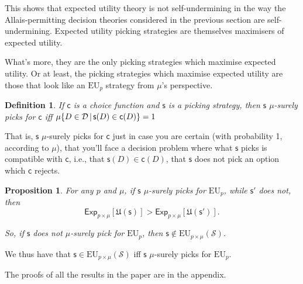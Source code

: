 \documentclass[a4paper]{article}
\newtheorem{definition}{Definition}
\newtheorem{proposition}[theorem]{Proposition}
\newcommand\D{\mathcal{D}}
\newcommand\s{\mathsf{s}}
\renewcommand\c{\mathsf{c}} %
\newcommand\Exp{\mathsf{Exp}}
\newcommand\EU{\mathrm{EU}}
\newcommand\U{\mathfrak{U}} %
\renewcommand{\color}[1]{}
\newcommand{\Strategies}{\mathcal{S}}
\newcommand\SetDelimiter[1][]{
	\nonscript\,#1\vert \allowbreak \nonscript\,\mathopen{}}
\providecommand\given{\SetDelimiter}
\newenvironment{CCM rewritten}
{\begingroup\color{blue}} %
{\endgroup}              %
\begin{document}
This shows that expected utility theory is not self-undermining in the way the Allais-permitting decision theories considered in the previous section are self-undermining. Expected utility picking strategies are themselves maximisers of expected utility. 

What's more, they are the only picking strategies which maximise expected utility. Or at least, the picking strategies which maximise expected utility are those that look like an $\EU_p$ strategy from $\mu$'s perspective. %

\begin{definition}
If $\c$ is a choice function and $\s$ is a picking strategy, then $\s$ \emph{$\mu$-surely picks for $\c$} iff $\mu\{D \in \D \given \s(D)\in \c(D)\}=1$
\end{definition}
{\color{violet}That is, $\s$ $\mu$-surely picks for $\c$ just in case you are certain (with probability 1, according to $\mu$), that you'll face a decision problem where what $\s$ picks is compatible with $\c$, i.e., that $\s(D)\in\c(D)$, that $\s$ does not pick an option which $\c$ rejects. }

\begin{proposition}\label{thm:eu-uniquely-optimal}
	For any $p$ and $\mu$, if $\s$ $\mu$-surely picks for $\EU_p$, while $\s'$ does not, then $$\Exp_{p\times\mu}[\U(\s)] > \Exp_{p\times\mu}[\U(\s')].$$
	
	So, if $\s$ does not $\mu$-surely pick for $\EU_p$, then $\s\notin\EU_{p\times\mu}(\Strategies)$. 
\end{proposition}

We thus have that $\s \in \EU_{p\times \mu}(\Strategies)$ iff $\s$ $\mu$-surely picks for $\EU_p$.

The proofs of all the results in the paper are in the appendix.
\end{document}
